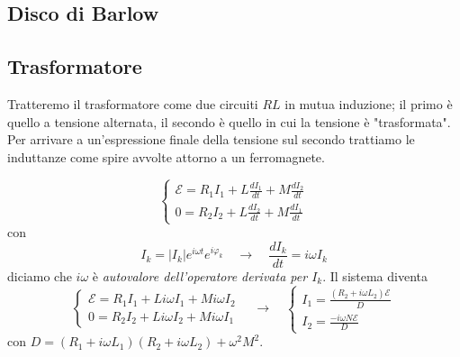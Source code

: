 \documentclass[x11names]{report}
\begin{document}
\subsection{Disco di Barlow}
\subsection{Trasformatore}
Tratteremo il trasformatore come due circuiti \(RL\) in mutua induzione; il primo è quello a tensione alternata, il secondo è quello in cui la tensione è "trasformata". Per arrivare a un'espressione finale della tensione sul secondo trattiamo le induttanze come spire avvolte attorno a un ferromagnete.

\begin{figure}[H]
	\centering
\end{figure}
\[
	\begin{cases}
		\mathcal{E} = R_1I_1 + L\frac{dI_1}{dt} + M\frac{dI_2}{dt} \\
		0 = R_2I_2 + L\frac{dI_2}{dt} + M\frac{dI_1}{dt}
	\end{cases}
\]
con 
\[
I_k = |I_k|e^{i\omega t}e^{i\varphi_k} \quad \to \quad \frac{dI_k}{dt} = i\omega I_k
\]
diciamo che \(i\omega\) è \textit{autovalore dell'operatore derivata per \(I_k\)}. Il sistema diventa
\[
	\begin{cases}
		\mathcal{E} = R_1I_1 + Li\omega I_1 + Mi\omega I_2 \\
		0 = R_2I_2 + Li\omega I_2 + Mi\omega I_1
	\end{cases} \quad \to \quad 
	\begin{cases}
		I_1 = \frac{(R_2 + i\omega L_2)\mathcal{E}}{D} \\
		I_2 = \frac{-i\omega N\mathcal{E}}{D} 
	\end{cases}
\]
con \(D = (R_1 + i\omega L_1)(R_2 +i \omega L_2) + \omega^2M^2\). \\
\end{document}
